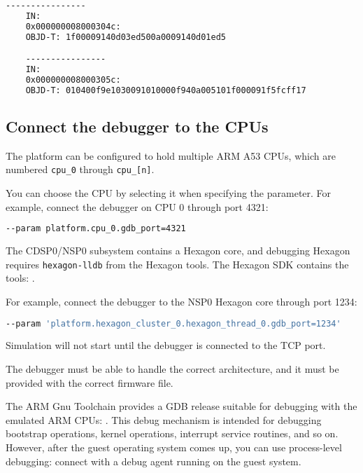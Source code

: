 \small
\begin{lstlisting}[language=bash]
    ----------------
    IN:
    0x000000008000304c:
    OBJD-T: 1f00009140d03ed500a0009140d01ed5

    ----------------
    IN:
    0x000000008000305c:
    OBJD-T: 010400f9e1030091010000f940a005101f000091f5fcff17

\end{lstlisting}
\normalsize

\subsection{Connect the debugger to the CPUs}
\label{sec:connect-debugger-cpus}

The platform can be configured to hold multiple ARM A53 CPUs, which are numbered {\small{\lstinline!cpu_0!}} through {\small{\lstinline!cpu_[n]!}}.

You can choose the CPU by selecting it when specifying the parameter. For example, connect the debugger on CPU 0 through port 4321:

\small
\begin{lstlisting}[language=bash]
    --param platform.cpu_0.gdb_port=4321
\end{lstlisting}
\normalsize

The CDSP0/NSP0 subsystem contains a Hexagon core, and debugging Hexagon
requires {\small{\lstinline!hexagon-lldb!}} from the Hexagon tools.  The Hexagon SDK
contains the tools: {}.

For example, connect the debugger to the NSP0 Hexagon core through port 1234:

\small
\begin{lstlisting}[language=bash]
    --param 'platform.hexagon_cluster_0.hexagon_thread_0.gdb_port=1234'
\end{lstlisting}
\normalsize

Simulation will not start until the debugger is connected to the TCP port.

\caution The debugger must be able to handle the correct architecture, and it must be provided with the correct firmware file.

The ARM Gnu Toolchain provides a GDB release suitable for debugging with the emulated ARM CPUs: {}. This debug mechanism is intended for debugging bootstrap operations, kernel operations, interrupt service routines, and so on. However, after the guest operating system comes up, you can use process-level debugging: connect with a debug agent running on the guest system.

